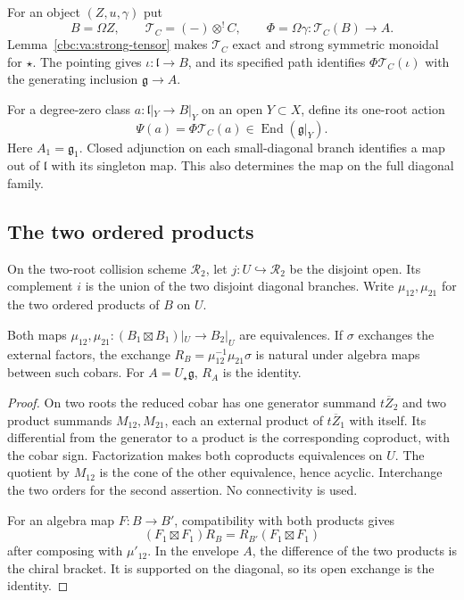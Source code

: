 For an object $(Z,u,\gamma)$ put
\[
 B=\Omega Z,
 \qquad \mathcal T_C=(-)\otimes^!C,
 \qquad \Phi=\Omega\gamma:\mathcal T_C(B)\longrightarrow A.
\]
Lemma~\ref{cbc:va:strong-tensor} makes $\mathcal T_C$
exact and strong symmetric monoidal for $\star$.
The pointing gives $\iota:\mathfrak l\to B$, and
its specified path identifies $\Phi\mathcal T_C(\iota)$
with the generating inclusion $\mathfrak g\to A$.

For a degree-zero class $a:\mathfrak l|_Y\to B|_Y$
on an open $Y\subset X$, define its one-root action
\[
 \Psi(a)=\Phi\mathcal T_C(a)\in
          \operatorname{End}(\mathfrak g|_Y).
\]
Here $A_1=\mathfrak g_1$. Closed adjunction on each small-diagonal branch identifies a map
out of $\mathfrak l$ with its singleton map. This also determines
the map on the full diagonal family.

\subsection{The two ordered products}

On the two-root collision scheme $\mathscr R_2$, let
$j:U\hookrightarrow\mathscr R_2$ be the disjoint open. Its complement
$i$ is the union of the two disjoint diagonal branches.
Write $\mu_{12},\mu_{21}$ for the two ordered
products of $B$ on $U$.

\begin{lemma}\label{cbc:rc:open-products}
Both maps
$\mu_{12},\mu_{21}:(B_1\boxtimes B_1)|_U\to B_2|_U$
are equivalences. If $\sigma$ exchanges the
external factors, the exchange
$R_B=\mu_{12}^{-1}\mu_{21}\sigma$ is natural
under algebra maps between such cobars.
For $A=U_\star\mathfrak g$, $R_A$ is the identity.
\end{lemma}
\begin{proof}
On two roots the reduced cobar has one generator
summand $t\overline Z_2$ and two product summands
$M_{12},M_{21}$, each an external product of
$t\overline Z_1$ with itself.
Its differential from the generator to a product
is the corresponding coproduct, with the cobar
sign. Factorization makes both coproducts
equivalences on $U$. The quotient by $M_{12}$
is the cone of the other equivalence, hence
acyclic. Interchange the two orders for the
second assertion. No connectivity is used.

For an algebra map $F:B\to B'$, compatibility
with both products gives
\[
 (F_1\boxtimes F_1)R_B=R_{B'}(F_1\boxtimes F_1)
\]
after composing with $\mu'_{12}$.
In the envelope $A$, the difference of the
two products is the chiral bracket. It is
supported on the diagonal, so its open
exchange is the identity.
\end{proof}

